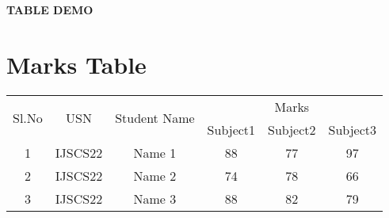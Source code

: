 \documentclass[12pt,a4paper]{article}
\begin{document}
	
	\begin{center}
		\begin{LARGE}
			\textbf{TABLE DEMO} 
		\end{LARGE}
	\end{center}   
	
	\section*{Marks Table}
	
	\begin{tabular}{|c|c|c|c|c|c|}
		\hline 
		\multirow{2}{*}{Sl.No} & \multirow{2}{*}{USN} & \multirow{2}{*}{Student Name} & \multicolumn{3}{c|}{Marks} \\ 
		\cline{4-6} 
		&  &  & Subject1 & Subject2 & Subject3 \\ 
		\hline 
		1 & IJSCS22 & Name 1 & 88 & 77 & 97 \\ 
		\hline 
		2 & IJSCS22 & Name 2 & 74 & 78 & 66 \\ 
		\hline 
		3 & IJSCS22 & Name 3 & 88 & 82 & 79 \\ 
		\hline 
	\end{tabular} 
	
\end{document}
